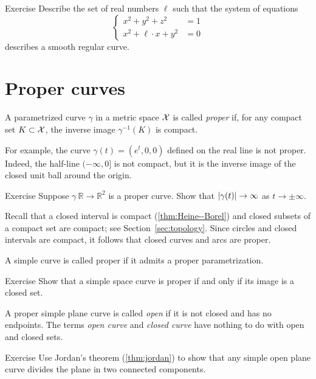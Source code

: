 \begin{thm}{Exercise}\label{ex:viviani}
Describe the set of real numbers $\ell$
such that the system of equations
\[\begin{cases}
x^2+y^2+z^2&=1
\\
x^2+\ell\cdot x+y^2&=0
\end{cases}\]
describes a smooth regular curve.
\end{thm}

\section{Proper curves}\label{sec:proper-curves}

A parametrized curve $\gamma$ in a metric space $\mathcal{X}$ is called \emph{proper} if, for any compact set $K \subset \mathcal{X}$, the inverse image $\gamma^{-1}(K)$ is compact.

For example, the curve $\gamma(t)=(e^t,0,0)$ defined on the real line is not proper.
Indeed, the half-line $(-\infty,0]$ is not compact, but it is the inverse image of the closed unit ball around the origin.

\begin{thm}{Exercise}\label{ex:open-curve}
Suppose $\gamma\:\mathbb{R}\to\mathbb{R}^2$ is a proper curve.
Show that  $|\gamma(t)|\z\to\infty$ as $t\to\pm\infty$.
\end{thm}


Recall that a closed interval is compact (\ref{thm:Heine--Borel}) and closed subsets of a compact set are compact;
see Section~\ref{sec:topology}.
Since circles and closed intervals are compact,
it follows that closed curves and arcs are proper.

A simple curve is called proper if it admits a proper parametrization.

\begin{thm}{Exercise}\label{ex:proper-closed}
Show that a simple space curve is proper if and only if its image is a closed set.

\end{thm}

A proper simple plane curve is called \emph{open} if it is not closed and has no endpoints.
The terms {}\emph{open curve} and {}\emph{closed curve} have nothing to do with open and closed sets.

\begin{thm}{Exercise}\label{ex:proper-curve}
Use Jordan's theorem (\ref{thm:jordan}) to show that any simple open plane curve divides the plane in two connected components.  
\end{thm}



